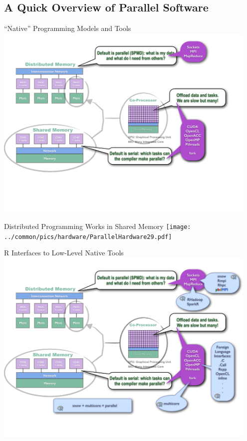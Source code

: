 \subsection{A Quick Overview of Parallel Software}
\makesubcontentsslidessec

\begin{frame}{``Native'' Programming Models and Tools}
\includegraphics[width=0.95\textwidth]
{../common/pics/hardware/ParallelHardware6.pdf}
\end{frame}

\begin{frame}{Distributed Programming Works in Shared Memory}
\texttt{[image: ../common/pics/hardware/ParallelHardware29.pdf]}
\end{frame}

\begin{frame}{R Interfaces to Low-Level Native Tools}
\includegraphics[width=0.95\textwidth]
{../common/pics/hardware/ParallelHardware10.pdf}
\end{frame}

